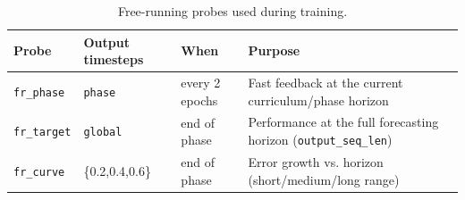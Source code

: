 \begin{table}[H]
\centering
\small
\caption{Free-running probes used during training.}
\label{tab:fr_probes}
\begin{tabular}{llll}
\toprule
Probe & Output timesteps & When & Purpose \\
\midrule
\texttt{fr\_phase}  & \texttt{phase}  & every 2 epochs & Fast feedback at the current curriculum/phase horizon \\
\texttt{fr\_target} & \texttt{global} & end of phase   & Performance at the full forecasting horizon (\texttt{output\_seq\_len}) \\
\texttt{fr\_curve}  & \{0.2,0.4,0.6\}  & end of phase   & Error growth vs. horizon (short/medium/long range) \\
\bottomrule
\end{tabular}
\end{table}